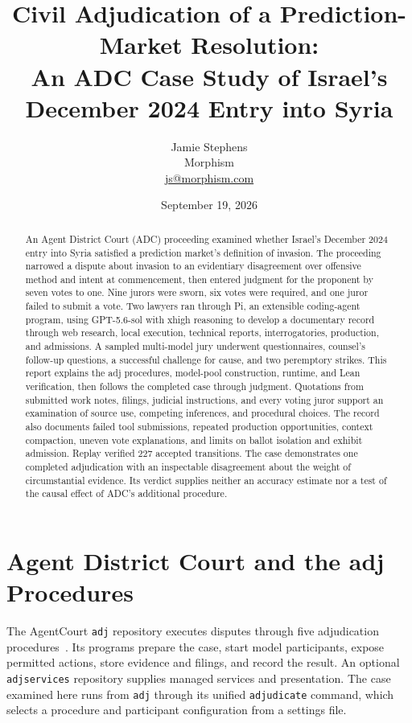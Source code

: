 \documentclass[11pt]{article}
\title{Civil Adjudication of a Prediction-Market Resolution:\\An ADC Case Study of Israel's December 2024 Entry into Syria}
\author{Jamie Stephens\\Morphism\\\href{mailto:js@morphism.com}{js@morphism.com}}
\date{September 19, 2026}
\newcommand{\code}[1]{\texttt{#1}}
\begin{document}
\maketitle
\begin{abstract}
An Agent District Court (ADC) proceeding examined whether Israel's December 2024 entry into Syria satisfied a prediction market's definition of invasion.  The proceeding narrowed a dispute about invasion to an evidentiary disagreement over offensive method and intent at commencement, then entered judgment for the proponent by seven votes to one.  Nine jurors were sworn, six votes were required, and one juror failed to submit a vote.  Two lawyers ran through Pi, an extensible coding-agent program, using GPT-5.6-sol with xhigh reasoning to develop a documentary record through web research, local execution, technical reports, interrogatories, production, and admissions.  A sampled multi-model jury underwent questionnaires, counsel's follow-up questions, a successful challenge for cause, and two peremptory strikes.  This report explains the adj procedures, model-pool construction, runtime, and Lean verification, then follows the completed case through judgment.  Quotations from submitted work notes, filings, judicial instructions, and every voting juror support an examination of source use, competing inferences, and procedural choices.  The record also documents failed tool submissions, repeated production opportunities, context compaction, uneven vote explanations, and limits on ballot isolation and exhibit admission.  Replay verified 227 accepted transitions.  The case demonstrates one completed adjudication with an inspectable disagreement about the weight of circumstantial evidence.  Its verdict supplies neither an accuracy estimate nor a test of the causal effect of ADC's additional procedure.
\end{abstract}

\clearpage
\begingroup
\small
\tableofcontents
\endgroup
\newpage

\section{Agent District Court and the adj Procedures}

The AgentCourt \code{adj} repository executes disputes through five adjudication procedures~\cite{adj}.  Its programs prepare the case, start model participants, expose permitted actions, store evidence and filings, and record the result.  An optional \code{adjservices} repository supplies managed services and presentation.  The case examined here runs from \code{adj} through its unified \code{adjudicate} command, which selects a procedure and participant configuration from a settings file.
\end{document}
